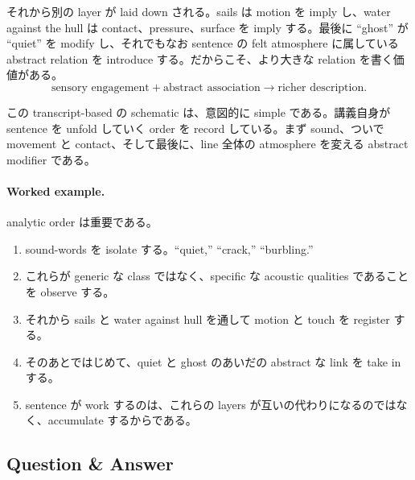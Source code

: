 それから別の layer が laid down される。sails は motion を imply し、water against the hull は contact、pressure、surface を imply する。最後に ``ghost'' が ``quiet'' を modify し、それでもなお sentence の felt atmosphere に属している abstract relation を introduce する。だからこそ、より大きな relation を書く価値がある。
\begin{equation}
\text{sensory engagement} + \text{abstract association} \to \text{richer description}.
\end{equation}

\begin{figure}[h]
\centering
{}
\end{figure}

この transcript-based の schematic は、意図的に simple である。講義自身が sentence を unfold していく order を record している。まず sound、ついで movement と contact、そして最後に、line 全体の atmosphere を変える abstract modifier である。

\paragraph{Worked example.} analytic order は重要である。
\begin{enumerate}
\item sound-words を isolate する。``quiet,'' ``crack,'' ``burbling.''
\item これらが generic な class ではなく、specific な acoustic qualities であることを observe する。
\item それから sails と water against hull を通して motion と touch を register する。
\item そのあとではじめて、quiet と ghost のあいだの abstract な link を take in する。
\item sentence が work するのは、これらの layers が互いの代わりになるのではなく、accumulate するからである。
\end{enumerate}

\subsection{Question \& Answer}

